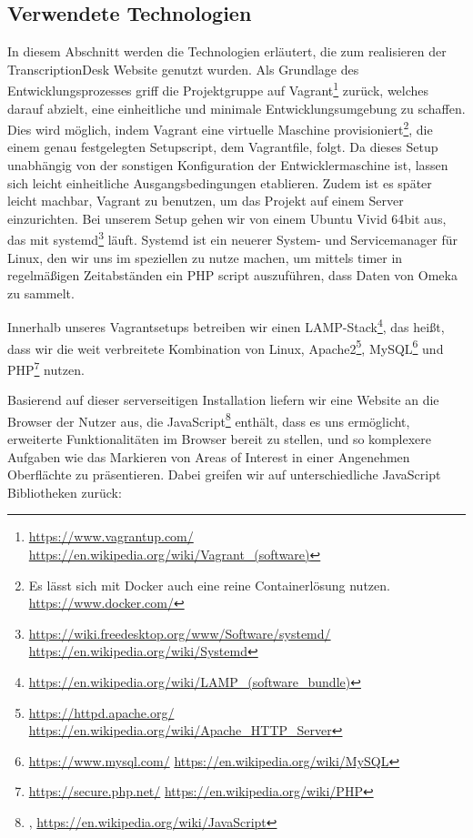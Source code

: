 \documentclass{article}
\begin{document}
\subsection{Verwendete Technologien}
In diesem Abschnitt werden die Technologien erläutert,
die zum realisieren der TranscriptionDesk Website genutzt wurden.
Als Grundlage des Entwicklungsprozesses griff die Projektgruppe auf Vagrant\footnote{
    \url{https://www.vagrantup.com/}\\
    \url{https://en.wikipedia.org/wiki/Vagrant_(software)}}
zurück, welches darauf abzielt, eine einheitliche und minimale Entwicklungsumgebung zu schaffen.
Dies wird möglich, indem Vagrant eine virtuelle Maschine provisioniert\footnote{
    Es lässt sich mit Docker auch eine reine Containerlösung nutzen.\\
    \url{https://www.docker.com/}},
die einem genau festgelegten Setupscript, dem Vagrantfile, folgt.
Da dieses Setup unabhängig von der sonstigen Konfiguration der Entwicklermaschine ist,
lassen sich leicht einheitliche Ausgangsbedingungen etablieren.
Zudem ist es später leicht machbar, Vagrant zu benutzen,
um das Projekt auf einem Server einzurichten.
Bei unserem Setup gehen wir von einem Ubuntu Vivid 64bit aus,
das mit systemd\footnote{
    \url{https://wiki.freedesktop.org/www/Software/systemd/}\\
    \url{https://en.wikipedia.org/wiki/Systemd}}
läuft. Systemd ist ein neuerer System- und Servicemanager für Linux,
den wir uns im speziellen zu nutze machen,
um mittels timer in regelmäßigen Zeitabständen
ein PHP script auszuführen,
dass Daten von Omeka zu sammelt.%

Innerhalb unseres Vagrantsetups betreiben wir einen LAMP-Stack\footnote{\url{https://en.wikipedia.org/wiki/LAMP_(software_bundle)}},
das heißt, dass wir die weit verbreitete Kombination von Linux, Apache2\footnote{
    \url{https://httpd.apache.org/}
    \url{https://en.wikipedia.org/wiki/Apache_HTTP_Server}}, MySQL\footnote{
    \url{https://www.mysql.com/}
    \url{https://en.wikipedia.org/wiki/MySQL}} und PHP\footnote{
    \url{https://secure.php.net/}
    \url{https://en.wikipedia.org/wiki/PHP}} nutzen.

Basierend auf dieser serverseitigen Installation liefern wir eine Website an die Browser der Nutzer aus,
die JavaScript\footnote{
    \cite{Flanagan},
    \url{https://en.wikipedia.org/wiki/JavaScript}} enthält, dass es uns ermöglicht,
erweiterte Funktionalitäten im Browser bereit zu stellen,
und so komplexere Aufgaben wie das Markieren von Areas of Interest
in einer Angenehmen Oberflächte zu präsentieren.
Dabei greifen wir auf unterschiedliche JavaScript Bibliotheken zurück:
\end{document}
